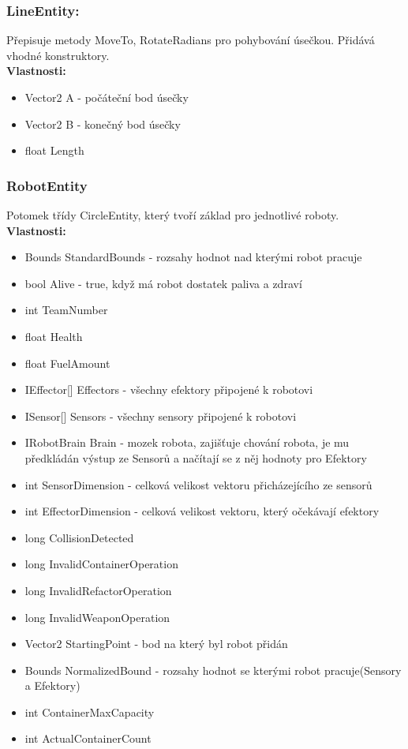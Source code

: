 \documentclass[12pt, oneside]{article}
\begin{document}
	\subsubsection{LineEntity:}
	Přepisuje metody MoveTo, RotateRadians pro pohybování úsečkou. Přidává vhodné konstruktory. \\ 
	\textbf{Vlastnosti:} 
	\begin{itemize}
	\item Vector2 A - počáteční bod úsečky
	\item Vector2 B - konečný bod úsečky
	\item float Length
	\end{itemize}
\newpage
	\subsubsection{RobotEntity}
	Potomek třídy CircleEntity, který tvoří základ pro jednotlivé roboty.  \\ 
	\textbf{Vlastnosti:}
	\begin{itemize}
 	\item Bounds StandardBounds - rozsahy hodnot nad kterými robot pracuje
	\item bool Alive - true, když má robot dostatek paliva a zdraví 
	\item int TeamNumber
	\item float Health
	\item float FuelAmount 
	\item IEffector[] Effectors - všechny efektory připojené k robotovi 
	\item ISensor[] Sensors - všechny sensory připojené k robotovi
	\item IRobotBrain Brain  - mozek robota, zajišťuje chování robota, je mu předkládán výstup ze Sensorů a načítají se z něj hodnoty pro Efektory
	\item int SensorDimension - celková velikost vektoru přicházejícího ze sensorů
	\item int EffectorDimension - celková velikost vektoru, který očekávají efektory 
	\item long CollisionDetected 
	\item long InvalidContainerOperation 
	\item long InvalidRefactorOperation
	\item long InvalidWeaponOperation 
	\item Vector2 StartingPoint - bod na který byl robot přidán
	\item Bounds NormalizedBound - rozsahy hodnot se kterými robot pracuje(Sensory a Efektory) 
 	\item int ContainerMaxCapacity 
	\item int ActualContainerCount
	\end{itemize}
\end{document}
